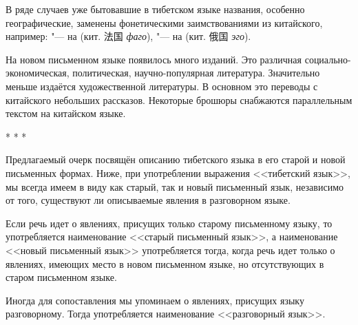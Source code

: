 В ряде случаев уже бытовавшие в тибетском языке названия, особенно географические, заменены фонетическими заимствованиями из китайского, например:  "--- на  (кит. {\unifont 法国} \textit{фаго}),  "--- на  (кит. {\unifont 俄国} \textit{эго}).

На новом письменном языке появилось много изданий. Это различная со\-циаль\-но-эко\-но\-ми\-чес\-кая, политическая, научно-популярная литература. Значительно меньше издаётся художественной литературы. В основном это переводы с китайского небольших рассказов. Некоторые брошюры снабжаются параллельным текстом на китайском языке.

\begin{center}
* * *
\end{center}

Предлагаемый очерк посвящён описанию тибетского языка в его старой и новой письменных формах. Ниже, при употреблении выражения <<тибетский язык>>, мы всегда имеем в виду как старый, так и новый письменный язык, независимо от того, существуют ли описываемые явления в разговорном языке.

Если речь идет о явлениях, присущих только старому письменному языку, то употребляется наименование <<старый письменный язык>>, а наименование <<новый письменный язык>> употребляется тогда, когда речь идет только о явлениях, имеющих место в новом письменном языке, но отсутствующих в старом письменном языке.

Иногда для сопоставления мы упоминаем о явлениях, присущих языку разговорному. Тогда употребляется наименование <<разговорный язык>>.


